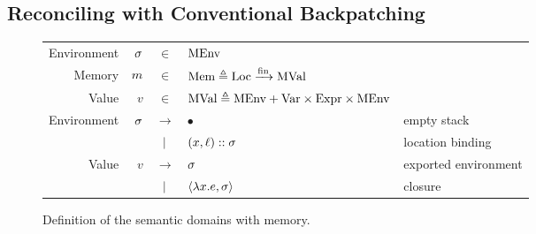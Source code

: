 \subsection{Reconciling with Conventional Backpatching}
\begin{figure}[h!]
  \centering
  \begin{tabular}{rrcll}
    Environment & $\sigma$ & $\in$         & $\text{MEnv}$                                                                       \\
    Memory      & $m$ & $\in$         & $\text{Mem}\triangleq{\text{Loc}}\xrightarrow{\text{fin}}{\text{MVal}}$                                           \\
    Value       & $v$    & $\in$         & $\text{MVal} \triangleq\text{MEnv}+\text{Var}\times\text{Expr}\times\text{MEnv}$                        \\
    Environment & $\sigma$ & $\rightarrow$ & $\bullet$                                             & empty stack          \\
                &        & $|$       & $(x,\ell)::\sigma$                                   & location binding     \\
    Value       & $v$    & $\rightarrow$ & $\sigma$                                                & exported environment \\
                &        & $|$       & $\langle \lambda x.e, \sigma \rangle$                   & closure
  \end{tabular}
  \caption{Definition of the semantic domains with memory.}
  \label{fig:memdomain}
\end{figure}
